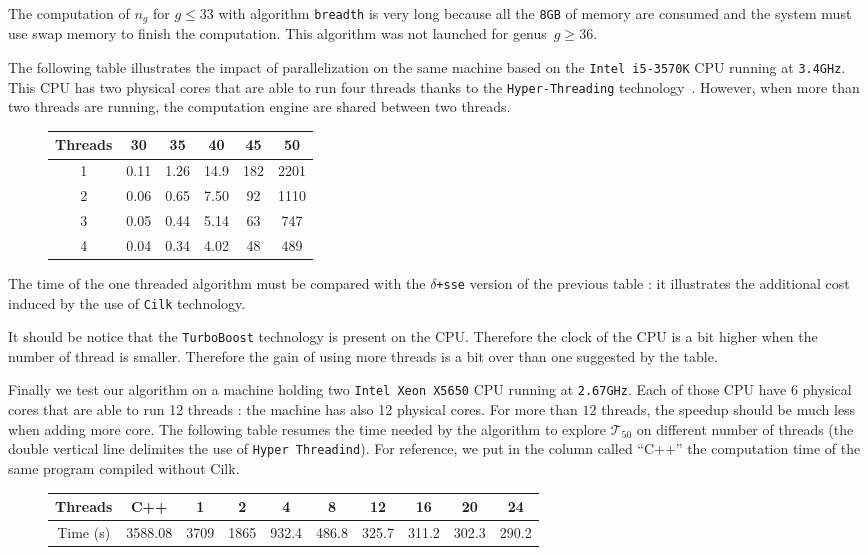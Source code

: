 \documentclass[reqno,11pt]{amsart}
\theoremstyle{plain}
\theoremstyle{definition}
\newcommand{\Cilk}{\texttt{Cilk}\xspace}
\renewcommand{\leq}{\leqslant}
\renewcommand{\geq}{\geqslant}
\renewcommand{\tt}[1]{\texttt{#1}}
\begin{document}
The computation of $n_g$ for $g\leq 33$ with algorithm \texttt{breadth} is very 
long because all the \texttt{8GB} of memory are consumed and the system 
must use swap memory to finish the computation. This algorithm was not launched 
for genus~$g\geq 36$.


The following table illustrates the impact of parallelization on the same 
machine based on the \tt{Intel\texttrademark{} i5-3570K} CPU 
running at \texttt{3.4GHz}. This CPU has two physical cores that are able 
to run four threads thanks to the \texttt{Hyper-Threading} 
technology~\cite{WikipediaHT}. However, when more 
than two threads are running, the computation engine are shared between two 
threads. 
  
  \begin{figure}[h!]
\begin{tabular}{|c|c|c|c|c|c|} 
\hline
Threads & 30 & 35 & 40 & 45 & 50 \\
\hline
1 &  0.11 & 1.26 & 14.9 & 182 & 2201 \\ 
2 &  0.06 & 0.65 & 7.50 &  92 & 1110\\
3 &  0.05 & 0.44 & 5.14 &  63 & 747 \\
4 &  0.04 & 0.34 & 4.02 &  48 & 489 \\
\hline
\end{tabular}
\end{figure}

The time of the one threaded algorithm  must be compared with the 
\texttt{$\delta$+sse} version of the previous table : it illustrates the 
additional cost induced by the use of \Cilk technology. 

It should be notice that the \texttt{TurboBoost} technology \cite{WikipediaTB} 
is present on the CPU. Therefore the clock of the CPU is a bit higher when the 
number of thread 
is smaller. Therefore the gain of using more threads is a bit over than one 
suggested by the table.

Finally we test our algorithm on a machine holding two 
\tt{Intel\texttrademark{} Xeon\texttrademark{} X5650} CPU running 
at \texttt{2.67GHz}.
Each of those CPU have 6 physical cores that are able to run 12 threads : the 
machine has also 12 physical cores.  
For more than $12$ threads, the speedup should be much less when
adding more core. The following table resumes the time needed by the algorithm 
to explore $\mathcal{T}_{50}$ on different number of threads (the double 
vertical line delimites the use of \texttt{Hyper Threadind}). For reference,
we put in the column called ``C++'' the computation time of the same
program compiled without Cilk.
\begin{figure}[h!]
\begin{tabular}{|c|c|c|c|c|c|c||c|c|c|}
\hline
 Threads & C++ & 1 & 2 & 4 & 8 & 12 & 16 & 20 & 24\\
 \hline
 Time (s) & 3588.08 & 3709 & 1865 & 932.4 & 486.8 & 325.7 & 311.2 & 302.3 & 290.2\\
 \hline
\end{tabular}
\end{figure}
\end{document}
